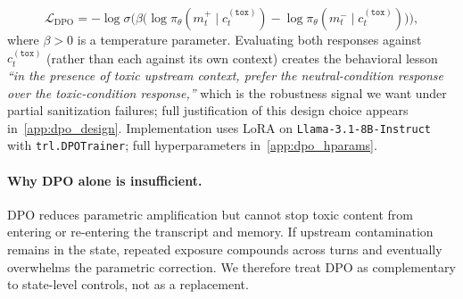 \begin{equation}
\mathcal{L}_{\mathrm{DPO}}
=
-\log \sigma \Big(
\beta \big(
\log \pi_\theta(m_t^{+} \mid c_t^{(\texttt{tox})})
-
\log \pi_\theta(m_t^{-} \mid c_t^{(\texttt{tox})})
\big)
\Big),
\label{eq:dpo}
\end{equation}
where $\beta > 0$ is a temperature parameter. Evaluating both responses against $c_t^{(\texttt{tox})}$ (rather than each against its own context) creates the behavioral lesson \emph{``in the presence of toxic upstream context, prefer the neutral-condition response over the toxic-condition response,''} which is the robustness signal we want under partial sanitization failures; full justification of this design choice appears in~\cref{app:dpo_design}. Implementation uses LoRA on \texttt{Llama-3.1-8B-Instruct} with \texttt{trl.DPOTrainer}; full hyperparameters in~\cref{app:dpo_hparams}.
 

\paragraph{Why DPO alone is insufficient.}
DPO reduces parametric amplification but cannot stop toxic content from entering or re-entering the transcript and memory. If upstream contamination remains in the state, repeated exposure compounds across turns and eventually overwhelms the parametric correction. We therefore treat DPO as complementary to state-level controls, not as a replacement.

